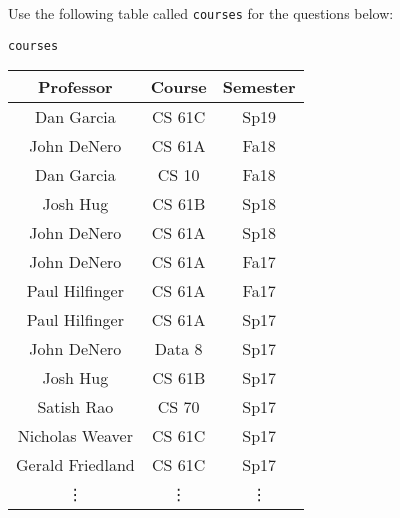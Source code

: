 Use the following table called \lstinline$courses$ for the questions below:
\begin{center}
    \texttt{courses}\\
    \begin{tabular}{ c c c }
        \textbf{Professor} & \textbf{Course} & \textbf{Semester} \\
        \hline
        Dan Garcia       & CS 61C & Sp19\\
        John DeNero      & CS 61A & Fa18\\
        Dan Garcia       & CS 10 & Fa18\\
        Josh Hug         & CS 61B & Sp18\\
        John DeNero      & CS 61A & Sp18\\
        John DeNero      & CS 61A & Fa17\\
        Paul Hilfinger   & CS 61A & Fa17\\
        Paul Hilfinger   & CS 61A & Sp17\\
        John DeNero      & Data 8 & Sp17\\
        Josh Hug         & CS 61B & Sp17\\
        Satish Rao       & CS 70  & Sp17\\
        Nicholas Weaver  & CS 61C & Sp17\\
        Gerald Friedland & CS 61C & Sp17\\
        \vdots           & \vdots & \vdots
    \end{tabular}
\end{center}
